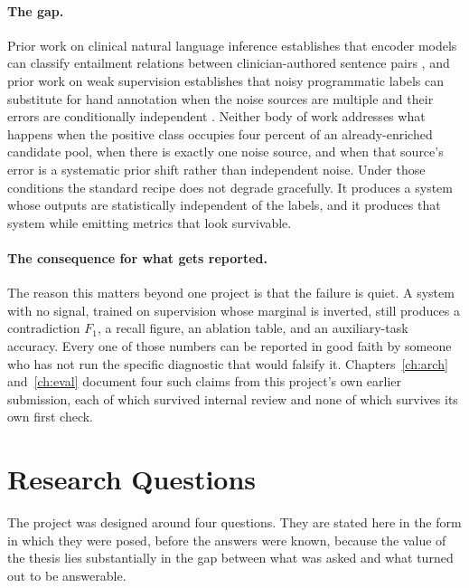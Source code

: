 \paragraph{The gap.} Prior work on clinical natural language inference
establishes that encoder models can classify entailment relations between
clinician-authored sentence pairs \citep{romanov2018mednli}, and prior work on
weak supervision establishes that noisy programmatic labels can substitute for
hand annotation when the noise sources are multiple and their errors are
conditionally independent \citep{ratner2016dataprogramming,ratner2017snorkel}.
Neither body of work addresses what happens when the positive class occupies
four percent of an already-enriched candidate pool, when there is exactly one
noise source, and when that source's error is a systematic prior shift rather
than independent noise. Under those conditions the standard recipe does not
degrade gracefully. It produces a system whose outputs are statistically
independent of the labels, and it produces that system while emitting metrics
that look survivable.

\paragraph{The consequence for what gets reported.} The reason this matters
beyond one project is that the failure is quiet. A system with no signal, trained
on supervision whose marginal is inverted, still produces a contradiction
$F_1$, a recall figure, an ablation table, and an auxiliary-task accuracy. Every
one of those numbers can be reported in good faith by someone who has not run
the specific diagnostic that would falsify it. Chapters~\ref{ch:arch}
and~\ref{ch:eval} document four such claims from this project's own earlier
submission, each of which survived internal review and none of which survives
its own first check.

\section{Research Questions}
\label{sec:intro-rqs}

The project was designed around four questions. They are stated here in the
form in which they were posed, before the answers were known, because the value
of the thesis lies substantially in the gap between what was asked and what
turned out to be answerable.


